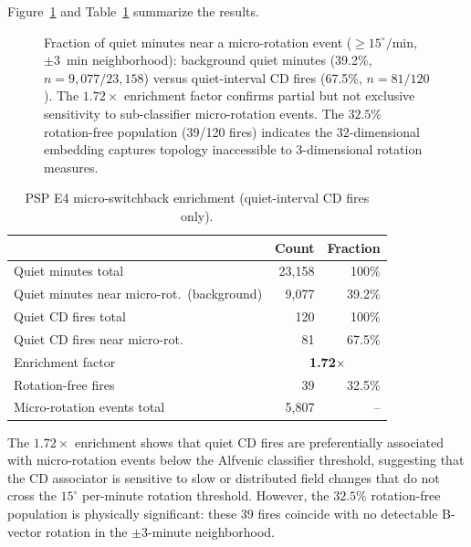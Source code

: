 \documentclass[draft]{agujournal2025}
\begin{document}
Figure~\ref{fig:enrichment} and Table~\ref{tab:enrichment} summarize the results.

\begin{figure}[htbp]
  \centering
  
  \caption{Fraction of quiet minutes near a micro-rotation event
    ($\geq 15^\circ/\mathrm{min}$, $\pm 3$~min neighborhood):
    background quiet minutes (39.2\%, $n=9{,}077/23{,}158$) versus
    quiet-interval CD fires (67.5\%, $n=81/120$).
    The $1.72\times$ enrichment factor confirms partial but not exclusive
    sensitivity to sub-classifier micro-rotation events.
    The $32.5\%$ rotation-free population (39/120 fires) indicates the
    32-dimensional embedding captures topology inaccessible to 3-dimensional
    rotation measures.}
  \label{fig:enrichment}
\end{figure}

\begin{table}[htbp]
  \centering
  \caption{PSP E4 micro-switchback enrichment (quiet-interval CD fires only).}
  \label{tab:enrichment}
  \begin{tabular}{lrr}
    \toprule
     & Count & Fraction \\
    \midrule
    Quiet minutes total          & 23{,}158 & 100\% \\
    Quiet minutes near micro-rot.\ (background) & 9{,}077 & 39.2\% \\
    Quiet CD fires total          &    120   & 100\% \\
    Quiet CD fires near micro-rot.\ & 81   & 67.5\% \\
    \midrule
    Enrichment factor             & \multicolumn{2}{c}{\textbf{1.72$\times$}} \\
    Rotation-free fires            &     39   & 32.5\% \\
    Micro-rotation events total   &  5{,}807 &  --  \\
    \bottomrule
  \end{tabular}
\end{table}

The $1.72\times$ enrichment shows that quiet CD fires are preferentially
associated with micro-rotation events below the Alfvenic classifier threshold,
suggesting that the CD associator is sensitive to slow or distributed field
changes that do not cross the $15^\circ$ per-minute rotation threshold.
However, the $32.5\%$ rotation-free population is physically significant:
these 39 fires coincide with no detectable B-vector rotation in the
$\pm 3$-minute neighborhood.
\end{document}
